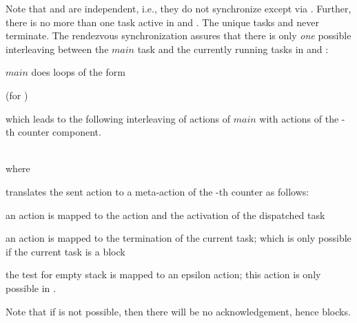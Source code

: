 \documentclass[runningheads,oribibl,]{article}
\newcommand{\main}{\ensuremath{\textit{main}}\xspace}
\newenvironment{myitemize}{\begin{list}{\labelitemi}{\setlength{\topsep}{4pt}\setlength{\partopsep}{0pt}
\setlength{\itemsep}{0pt}
\setlength{\itemindent}{0ex}
\setlength{\listparindent}{0ex}
\setlength{\leftmargin}{4ex}\setlength{\labelwidth}{2ex}
}}
{\end{list}}
\begin{document}
Note that  and  are independent, i.e., they do not
synchronize except via . Further, there is no more than one task active
in  and . The unique tasks  and 
never terminate. The rendezvous synchronization assures that there is only
\emph{one} possible interleaving between the \main task and the currently running
tasks in  and :
\begin{myitemize}
  \item \main does loops of the form\\
\hfill (for )\\

  \item which leads to the following interleaving of actions of \main
    with actions of the -th counter component.\\
\\

where
translates the sent action  to a meta-action  of the -th counter
as follows:\\
\begin{myitemize}
  \item an action  is mapped to the action
     and the activation of the dispatched task
  \item an action  is mapped to the termination of
    the current task; which is only possible if the current task
    is a block 
  \item the test for empty stack is mapped to an epsilon action; this action
    is only possible in .
\end{myitemize}
\end{myitemize}
Note that if  is not possible, then there will be no acknowledgement,
hence  blocks.
\end{document}
